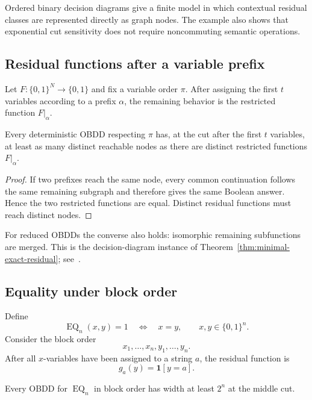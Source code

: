 Ordered binary decision diagrams give a finite model in which contextual
residual classes are represented directly as graph nodes.  The example also
shows that exponential cut sensitivity does not require noncommuting semantic
operations.

\subsection{Residual functions after a variable prefix}

Let $F:\{0,1\}^N\to\{0,1\}$ and fix a variable order $\pi$.  After assigning
the first $t$ variables according to a prefix $\alpha$, the remaining behavior
is the restricted function $F|_\alpha$.

\begin{proposition}
\label{prop:obdd-residual-lower-bound}
Every deterministic OBDD respecting $\pi$ has, at the cut after the first $t$
variables, at least as many distinct reachable nodes as there are distinct
restricted functions $F|_\alpha$.
\end{proposition}

\begin{proof}
If two prefixes reach the same node, every common continuation follows the same
remaining subgraph and therefore gives the same Boolean answer.  Hence the two
restricted functions are equal.  Distinct residual functions must reach
distinct nodes.
\end{proof}

For reduced OBDDs the converse also holds: isomorphic remaining subfunctions
are merged.  This is the decision-diagram instance of
Theorem~\ref{thm:minimal-exact-residual}; see~\cite{Bryant1986,Wegener2000}.

\subsection{Equality under block order}

Define
\[
  \operatorname{EQ}_n(x,y)=1
  \quad\Longleftrightarrow\quad
  x=y,
  \qquad x,y\in\{0,1\}^n.
\]
Consider the block order
\[
  x_1,\ldots,x_n,y_1,\ldots,y_n.
\]
After all $x$-variables have been assigned to a string $a$, the residual
function is
\[
  g_a(y)=\mathbf1[y=a].
\]

\begin{theorem}
\label{thm:eq-block-width}
Every OBDD for $\operatorname{EQ}_n$ in block order has width at least $2^n$
at the middle cut.
\end{theorem}

